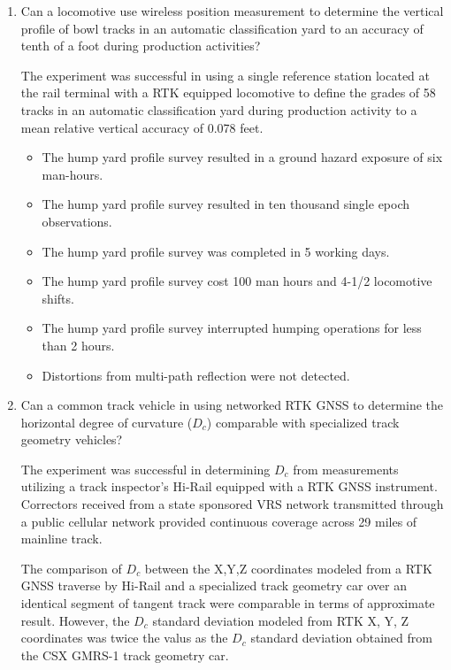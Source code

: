 \begin{enumerate}

\item Can a locomotive use wireless position measurement to determine the vertical profile of bowl tracks in an automatic classification yard to an accuracy of tenth of a foot during production activities?

The experiment was successful in using a single reference station located at the rail terminal with a RTK equipped locomotive to define the grades of 58 tracks in an automatic classification yard during production activity to a mean relative vertical accuracy of 0.078 feet.
\begin{itemize}
\item The hump yard profile survey resulted in a ground hazard exposure of six man-hours.
\item The hump yard profile survey resulted in ten thousand single epoch observations.
\item The hump yard profile survey was completed in 5 working days.
\item The hump yard profile survey cost 100 man hours and 4-1/2 locomotive shifts.
\item The hump yard profile survey interrupted humping operations for less than 2 hours.
\item Distortions from multi-path reflection were not detected. 
\end{itemize}

\item Can a common track vehicle in using networked RTK GNSS to determine the horizontal degree of curvature ($D_c$) comparable with specialized track geometry vehicles?

The experiment was successful in determining $D_c$ from measurements utilizing a track inspector's Hi-Rail equipped with a RTK GNSS instrument. Correctors received from a state sponsored VRS network transmitted through a public cellular network provided continuous coverage across 29 miles of mainline track.

The comparison of $D_c$ between the X,Y,Z coordinates modeled from a RTK GNSS traverse by Hi-Rail and a specialized track geometry car over an identical segment of tangent track were comparable in terms of approximate result. However, the $D_c$ standard deviation modeled from RTK X, Y, Z coordinates was twice the valus as the $D_c$ standard deviation obtained from the CSX GMRS-1 track geometry car.


\end{enumerate}
